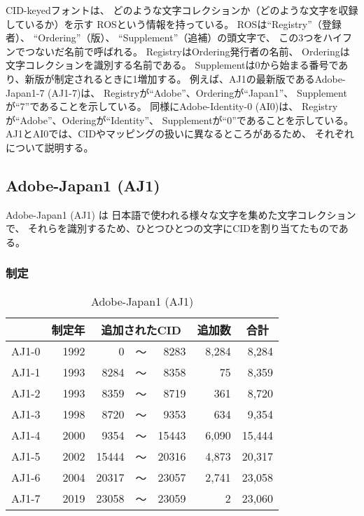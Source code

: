 CID-keyedフォントは、
どのような文字コレクションか（どのような文字を収録しているか）を示す
ROSという情報を持っている。
ROSは``Registry''（登録者）、
``Ordering''（版）、
``Supplement''（追補）の頭文字で、
この3つをハイフンでつないだ名前で呼ばれる。
RegistryはOrdering発行者の名前、
Orderingは文字コレクションを識別する名前である。
Supplementは0から始まる番号であり、新版が制定されるときに1増加する。
例えば、AJ1の最新版であるAdobe-Japan1-7 (AJ1-7)は、
Registryが``Adobe''、Orderingが``Japan1''、
Supplementが``7''であることを示している。
同様にAdobe-Identity-0 (AI0)は、
Registryが``Adobe''、Oderingが``Identity''、
Supplementが``0''であることを示している。
AJ1とAI0では、CIDやマッピングの扱いに異なるところがあるため、
それぞれについて説明する。

\subsection{Adobe-Japan1 (AJ1)}

Adobe-Japan1 (AJ1) \cite{aj1}は
日本語で使われる様々な文字を集めた文字コレクションで、
それらを識別するため、ひとつひとつの文字にCIDを割り当てたものである。

\subsubsection{制定}

\begin{table}[tb]
  \centering
  \caption{Adobe-Japan1 (AJ1)}
  \label{tbl:aj1}
  \small
  \begin{tabular}{l|r|rcr|r|r}
    & \multicolumn{1}{c|}{制定年}
    & \multicolumn{3}{c|}{追加されたCID}
    & \multicolumn{1}{c|}{追加数}
    & \multicolumn{1}{c}{合計} \\
    \hline
    AJ1-0 & 1992 &     0 & ～ &  8283 & 8,284 &  8,284 \\
    AJ1-1 & 1993 &  8284 & ～ &  8358 &    75 &  8,359 \\
    AJ1-2 & 1993 &  8359 & ～ &  8719 &   361 &  8,720 \\
    AJ1-3 & 1998 &  8720 & ～ &  9353 &   634 &  9,354 \\
    AJ1-4 & 2000 &  9354 & ～ & 15443 & 6,090 & 15,444 \\
    AJ1-5 & 2002 & 15444 & ～ & 20316 & 4,873 & 20,317 \\
    AJ1-6 & 2004 & 20317 & ～ & 23057 & 2,741 & 23,058 \\
    AJ1-7 & 2019 & 23058 & ～ & 23059 &     2 & 23,060
  \end{tabular}
\end{table}

